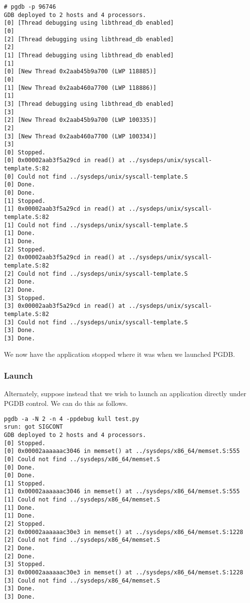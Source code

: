 \documentclass{refart}
\begin{document}
\begin{Verbatim}
# pgdb -p 96746
GDB deployed to 2 hosts and 4 processors.
[0] [Thread debugging using libthread_db enabled]
[0] 
[2] [Thread debugging using libthread_db enabled]
[2] 
[1] [Thread debugging using libthread_db enabled]
[1] 
[0] [New Thread 0x2aab45b9a700 (LWP 118885)]
[0] 
[1] [New Thread 0x2aab460a7700 (LWP 118886)]
[1] 
[3] [Thread debugging using libthread_db enabled]
[3] 
[2] [New Thread 0x2aab45b9a700 (LWP 100335)]
[2] 
[3] [New Thread 0x2aab460a7700 (LWP 100334)]
[3] 
[0] Stopped.
[0] 0x00002aab3f5a29cd in read() at ../sysdeps/unix/syscall-template.S:82
[0] Could not find ../sysdeps/unix/syscall-template.S
[0] Done.
[0] Done.
[1] Stopped.
[1] 0x00002aab3f5a29cd in read() at ../sysdeps/unix/syscall-template.S:82
[1] Could not find ../sysdeps/unix/syscall-template.S
[1] Done.
[1] Done.
[2] Stopped.
[2] 0x00002aab3f5a29cd in read() at ../sysdeps/unix/syscall-template.S:82
[2] Could not find ../sysdeps/unix/syscall-template.S
[2] Done.
[2] Done.
[3] Stopped.
[3] 0x00002aab3f5a29cd in read() at ../sysdeps/unix/syscall-template.S:82
[3] Could not find ../sysdeps/unix/syscall-template.S
[3] Done.
[3] Done.
\end{Verbatim}

We now have the application stopped where it was when we launched PGDB.

\subsubsection{Launch}

Alternately, suppose instead that we wish to launch an application directly under PGDB control. We can do this as follows.

\begin{Verbatim}
pgdb -a -N 2 -n 4 -ppdebug kull test.py
srun: got SIGCONT
GDB deployed to 2 hosts and 4 processors.
[0] Stopped.
[0] 0x00002aaaaaac3046 in memset() at ../sysdeps/x86_64/memset.S:555
[0] Could not find ../sysdeps/x86_64/memset.S
[0] Done.
[0] Done.
[1] Stopped.
[1] 0x00002aaaaaac3046 in memset() at ../sysdeps/x86_64/memset.S:555
[1] Could not find ../sysdeps/x86_64/memset.S
[1] Done.
[1] Done.
[2] Stopped.
[2] 0x00002aaaaaac30e3 in memset() at ../sysdeps/x86_64/memset.S:1228
[2] Could not find ../sysdeps/x86_64/memset.S
[2] Done.
[2] Done.
[3] Stopped.
[3] 0x00002aaaaaac30e3 in memset() at ../sysdeps/x86_64/memset.S:1228
[3] Could not find ../sysdeps/x86_64/memset.S
[3] Done.
[3] Done.
\end{Verbatim}
\end{document}

